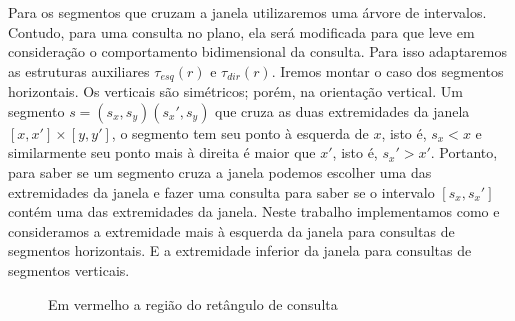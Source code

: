 Para os segmentos que cruzam a janela utilizaremos uma árvore de intervalos. Contudo, para uma consulta no plano, ela será modificada para que leve em consideração o comportamento bidimensional da consulta. Para isso adaptaremos as estruturas auxiliares $\tau_{esq}(r)$ e $\tau_{dir}(r)$.
Iremos montar o caso dos segmentos horizontais. Os verticais são simétricos; porém, na orientação vertical. Um segmento $s= (s_x,s_y) (s_x',s_y)$ que cruza as duas extremidades da janela $[x, x'] \times [y, y']$, o segmento tem seu ponto à esquerda de $x$, isto é, $s_x < x$ e similarmente seu ponto mais à direita é maior que $x'$, isto é,  $s_x' > x'$. Portanto, para saber se um segmento cruza a janela podemos escolher uma das extremidades da janela e fazer uma consulta para saber se o intervalo $[s_x, s_x']$ contém uma das extremidades da janela. Neste trabalho implementamos como \cite{cgi1} e consideramos a extremidade mais à esquerda da janela para consultas de segmentos horizontais. E a extremidade inferior da janela para consultas de segmentos verticais.
\begin{figure}[h]
\centering
{}
\caption {Em vermelho a região do retângulo de consulta}
\label{fig:23}
\end{figure}

